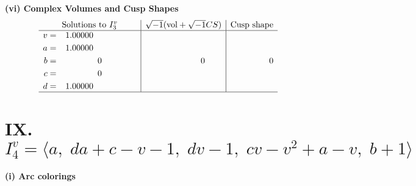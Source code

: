 \documentclass[1p]{elsarticle_modified}
\theoremstyle{definition}
\newcommand{\I}{\sqrt{-1}}
\begin{document}
\newpage\flushleft \textbf{(vi) Complex Volumes and Cusp Shapes}
$$\begin{array}{c|c|c}  
\text{Solutions to }I^v_{3}& \I (\text{vol} + \sqrt{-1}CS) & \text{Cusp shape}\\
 \hline 
\begin{aligned}
v &= \phantom{-}1.00000\phantom{ +0.000000I} \\
a &= \phantom{-}1.00000\phantom{ +0.000000I} \\
b &= \phantom{-0.000000 } 0 \\
c &= \phantom{-0.000000 } 0 \\
d &= \phantom{-}1.00000\phantom{ +0.000000I}\end{aligned}
 & \phantom{-0.000000 } 0 & \phantom{-0.000000 } 0\\
 \hline 
 \end{array}$$\newpage\newpage\renewcommand{\arraystretch}{1}
\centering \section*{IX. $I^v_{4}= \langle a,\;d a+c- v-1,\;d v-1,\;c v- v^2+a- v,\;b+1 \rangle$}
\flushleft \textbf{(i) Arc colorings}\\
\end{document}
